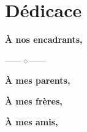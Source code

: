 \chapter*{Dédicace}
\thispagestyle{noheaderpagenum}

\vspace*{1cm}

\noindent
\textbf{À nos encadrants,}\\
\textit{\lipsum[1][1-2]}

\begin{center}{\small\textcolor{gray}{------\enspace\(\diamond\)\enspace------}}\end{center}


\noindent
\textbf{À mes parents,}\\
\textit{\lipsum[1][1-2]}

\vspace{0.4cm}

\noindent
\textbf{À mes frères,}\\
\textit{\lipsum[1][1-2]}

\vspace{0.4cm}

\noindent
\textbf{À mes amis,}\\
\textit{\lipsum[1][1-2]}


\clearpage